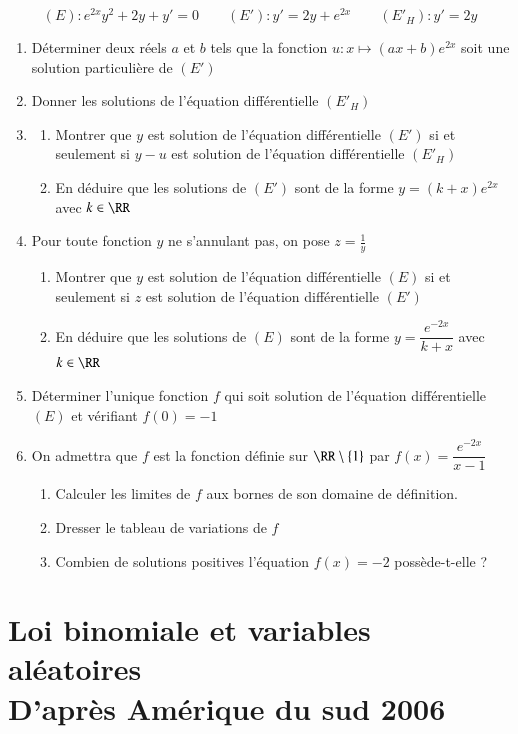 \documentclass[oneside,12pt]{article}
\let\oldsection\section
\renewcommand{\section}{\newpage\oldsection}
\begin{document}
\[(E):e^{2x}y^2+2y+y'=0 \qquad (E'):y'=2y+e^{2x} \qquad (E'_H):y'=2y\]
\begin{enumerate}
    \item Déterminer deux réels $a$ et $b$ tels que la fonction $u:x\mapsto(ax+b)e^{2x}$ soit une solution particulière de $(E')$
    \item Donner les solutions de l'équation différentielle $(E'_H)$
    \item \begin{enumerate}
        \item Montrer que $y$ est solution de l'équation différentielle $(E')$ si et seulement si $y-u$ est solution de l'équation différentielle $(E'_H)$
        \item En déduire que les solutions de $(E')$ sont de la forme $y=(k+x)e^{2x}$ \quad avec $k\in\RR$
    \end{enumerate}
    \item Pour toute fonction $y$ ne s'annulant pas, on pose $z=\frac{1}{y}$
    \begin{enumerate}
        \item Montrer que $y$ est solution de l'équation différentielle $(E)$ si et seulement si $z$ est solution de l'équation différentielle $(E')$
        \item En déduire que les solutions de $(E)$ sont de la forme $y=\dfrac{e^{-2x}}{k+x}$ \quad avec $k\in\RR$
    \end{enumerate}
    \item Déterminer l'unique fonction $f$ qui soit solution de l'équation différentielle $(E)$ et vérifiant $f(0)=-1$
    \item On admettra que $f$ est la fonction définie sur $\RR\setminus\{1\}$ par $f(x)=\dfrac{e^{-2x}}{x-1}$
    \begin{enumerate}
        \item Calculer les limites de $f$ aux bornes de son domaine de définition.
        \item Dresser le tableau de variations de $f$
        \item Combien de solutions positives l'équation $f(x)=-2$ possède-t-elle ?
    \end{enumerate}
\end{enumerate}





\section{Loi binomiale et variables aléatoires\\ \vspace{-4mm}\small{D'après Amérique du sud 2006}}
\end{document}
